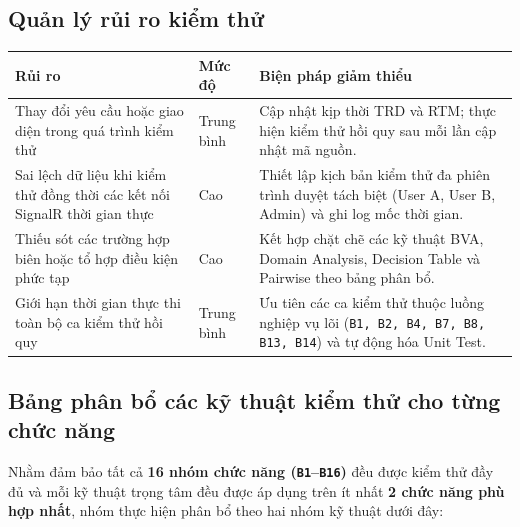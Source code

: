 \documentclass[11pt,a4paper]{article}
\begin{document}
\subsection{Quản lý rủi ro kiểm thử}
\begin{table}[H]
\centering
\small
\begin{tabularx}{\textwidth}{|L{4.5cm}|C{2.4cm}|X|}
\hline
{}
\textbf{Rủi ro} & \textbf{Mức độ} & \textbf{Biện pháp giảm thiểu} \tabularnewline
\hline
Thay đổi yêu cầu hoặc giao diện trong quá trình kiểm thử & Trung bình & Cập nhật kịp thời TRD và RTM; thực hiện kiểm thử hồi quy sau mỗi lần cập nhật mã nguồn. \\ \hline
Sai lệch dữ liệu khi kiểm thử đồng thời các kết nối SignalR thời gian thực & Cao & Thiết lập kịch bản kiểm thử đa phiên trình duyệt tách biệt (User A, User B, Admin) và ghi log mốc thời gian. \\ \hline
Thiếu sót các trường hợp biên hoặc tổ hợp điều kiện phức tạp & Cao & Kết hợp chặt chẽ các kỹ thuật BVA, Domain Analysis, Decision Table và Pairwise theo bảng phân bổ. \\ \hline
Giới hạn thời gian thực thi toàn bộ ca kiểm thử hồi quy & Trung bình & Ưu tiên các ca kiểm thử thuộc luồng nghiệp vụ lõi (\texttt{B1, B2, B4, B7, B8, B13, B14}) và tự động hóa Unit Test. \\ \hline
\end{tabularx}
\end{table}

\subsection{Bảng phân bổ các kỹ thuật kiểm thử cho từng chức năng}
Nhằm đảm bảo tất cả \textbf{16 nhóm chức năng (\texttt{B1}--\texttt{B16})} đều được kiểm thử đầy đủ và mỗi kỹ thuật trọng tâm đều được áp dụng trên ít nhất \textbf{2 chức năng phù hợp nhất}, nhóm thực hiện phân bổ theo hai nhóm kỹ thuật dưới đây:
\end{document}
